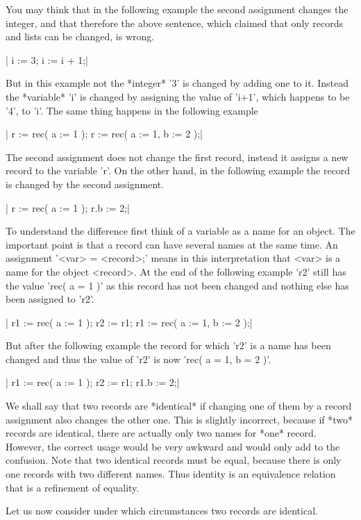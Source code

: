 You may think that in the following example the second assignment changes
the integer, and  that therefore the  above sentence, which claimed  that
only records and lists can be changed, is wrong.

|    i := 3;
    i :=  i + 1;|

But in this example not the *integer* '3' is changed by adding one to it.
Instead the *variable*  'i'  is changed by assigning the value of  'i+1',
which happens to be '4', to 'i'.  The same thing happens in the following
example

|    r := rec( a := 1 );
    r := rec( a := 1, b := 2 );|

The  second assignment does  not   change the  first  record, instead  it
assigns a new  record to  the variable 'r'.    On the other hand,  in the
following example the record is changed by the second assignment.

|    r := rec( a := 1 );
    r.b := 2;|

To understand the difference first think of a variable as  a  name for an
object.  The important  point is that a record  can have several names at
the  same time.   An assignment  '<var>  \:=  <record>;'  means  in  this
interpretation  that <var> is a name for the object <record>.  At the end
of the following example  'r2'  still  has the value 'rec(  a \:= 1 )' as
this record has not  been changed and nothing else has been  assigned  to
'r2'.

|    r1 := rec( a := 1 );
    r2 := r1;
    r1 := rec( a := 1, b := 2 );|

But after the following example  the record for which 'r2'  is a name has
been changed and thus the value of 'r2' is now 'rec( a \:= 1, b \:= 2 )'.

|    r1 := rec( a := 1 );
    r2 := r1;
    r1.b := 2;|

We shall say that two records are *identical* if changing  one of them by
a  record assignment  also  changes  the  other  one.   This is  slightly
incorrect, because if  *two*  records are identical, there  are  actually
only two names  for *one*  record.  However, the  correct  usage would be
very   awkward  and would only  add   to the confusion.     Note that two
identical records must  be equal, because  there is only one records with
two different names.  Thus identity is  an equivalence relation that is a
refinement of equality.

Let us now consider under which circumstances two records are identical.

